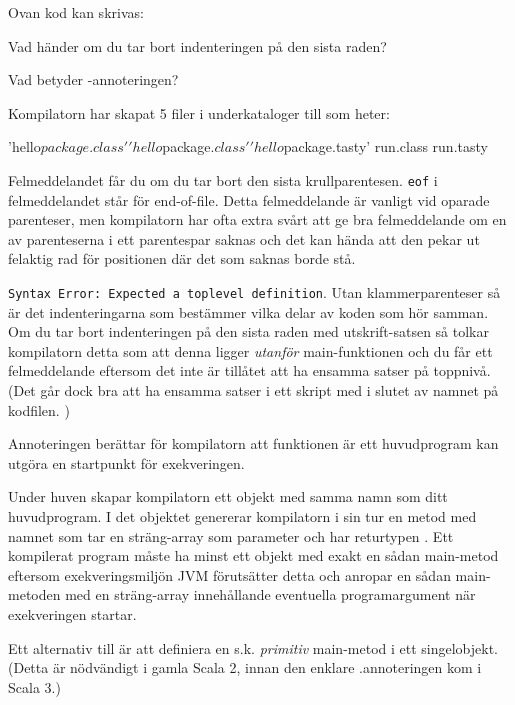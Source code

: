 Ovan kod kan skrivas:

Vad händer om du tar bort indenteringen på den sista raden?

\Subtask Vad betyder -annoteringen?


\SOLUTION


\TaskSolved \what

\SubtaskSolved  Kompilatorn har skapat 5 filer i underkataloger till  som heter:
\begin{REPLnonum}
'hello$package.class'  'hello$package$.class'  'hello$package.tasty'
run.class   run.tasty
\end{REPLnonum}

\SubtaskSolved  Felmeddelandet får du om du tar bort den sista krullparentesen. \texttt{eof} i felmeddelandet står för end-of-file. Detta felmeddelande är vanligt vid oparade parenteser, men kompilatorn har ofta extra svårt att ge bra felmeddelande om en av parenteserna i ett parentespar saknas och det kan hända att den pekar ut felaktig rad för positionen där det som saknas borde stå.

\SubtaskSolved  \texttt{Syntax Error: Expected a toplevel definition}. Utan klammerparenteser så är det indenteringarna som bestämmer vilka delar av koden som hör samman. Om du tar bort indenteringen på den sista raden med utskrift-satsen så tolkar kompilatorn detta som att denna ligger \emph{utanför} main-funktionen och du får ett felmeddelande eftersom det inte är tillåtet att ha ensamma satser på toppnivå. (Det går dock bra att ha ensamma satser i ett skript med  i slutet av namnet på kodfilen. )

\SubtaskSolved Annoteringen  berättar för kompilatorn att funktionen är ett huvudprogram kan utgöra en startpunkt för exekveringen. 

Under huven skapar kompilatorn ett objekt med samma namn som ditt huvudprogram. I det objektet genererar kompilatorn i sin tur 
en metod med namnet  som tar en sträng-array som parameter och har returtypen . Ett kompilerat program måste ha minst ett objekt med exakt en sådan main-metod
eftersom exekveringsmiljön JVM förutsätter detta och anropar en sådan main-metoden med en sträng-array innehållande eventuella programargument när exekveringen startar.

Ett alternativ till  är att definiera en s.k. \emph{primitiv} main-metod i ett singelobjekt. (Detta är nödvändigt i gamla Scala 2, innan den enklare .annoteringen kom i Scala 3.)

